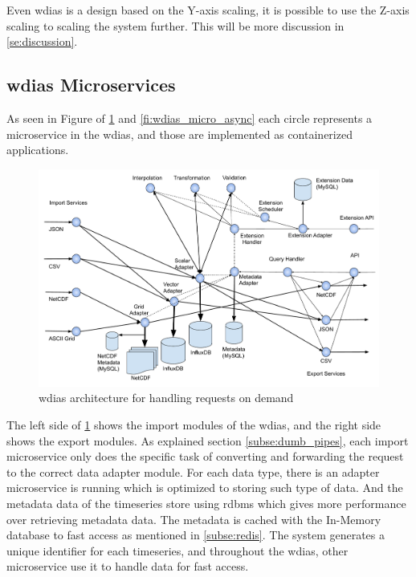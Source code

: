 Even \acrshort{wdias} is a design based on the Y-axis scaling, it is possible to use the Z-axis scaling to scaling the system further. This will be more discussion in \cref{se:discussion}.




\subsection{\acrshort{wdias} Microservices}
\label{sebse:wdias_microservices}
As seen in Figure of \cref{fi:wdias_micro_on_demand} and \cref{fi:wdias_micro_async} each circle represents a microservice in the \acrshort{wdias}, and those are implemented as containerized applications.
\begin{figure}[htp]
    \centering
    \includegraphics[width=1\textwidth]{method/microservice/microservice_architecture-handle_on_demand-v4.pdf}
    \caption{\acrshort{wdias} architecture for handling requests on demand}
    \label{fi:wdias_micro_on_demand}
\end{figure}
The left side of \cref{fi:wdias_micro_on_demand} shows the import modules of the \acrshort{wdias}, and the right side shows the export modules. As explained section \cref{subse:dumb_pipes}, each import microservice only does the specific task of converting and forwarding the request to the correct data adapter module.
For each data type, there is an adapter microservice is running which is optimized to storing such type of data. And the metadata data of the timeseries store using \acrshort{rdbms} which gives more performance over retrieving metadata data. The metadata is cached with the In-Memory database to fast access as mentioned in \cref{subse:redis}.
The system generates a unique identifier for each timeseries, and throughout the \acrshort{wdias}, other microservice use it to handle data for fast access.

